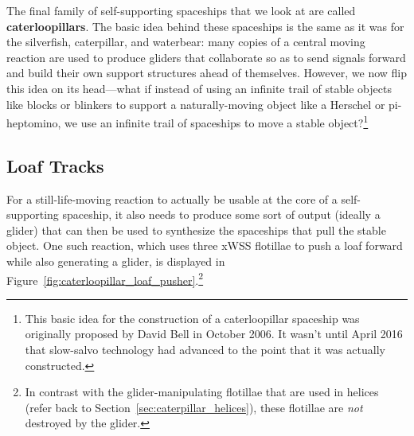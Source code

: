 The final family of self-supporting spaceships that we look at are called \textbf{caterloopillars}. The basic idea behind these spaceships is the same as it was for the silverfish, caterpillar, and waterbear: many copies of a central moving reaction are used to produce gliders that collaborate so as to send signals forward and build their own support structures ahead of themselves. However, we now flip this idea on its head---what if instead of using an infinite trail of stable objects like blocks or blinkers to support a naturally-moving object like a Herschel or pi-heptomino, we use an infinite trail of spaceships to move a stable object?\footnote{This basic idea for the construction of a caterloopillar spaceship was originally proposed by David Bell in October 2006. It wasn't until April 2016 that slow-salvo technology had advanced to the point that it was actually constructed.}


\subsection{Loaf Tracks}\label{sec:caterloopillar_loaf_track}

For a still-life-moving reaction to actually be usable at the core of a self-supporting spaceship, it also needs to produce some sort of output (ideally a glider) that can then be used to synthesize the spaceships that pull the stable object. One such reaction, which uses three xWSS flotillae to push a loaf forward while also generating a glider, is displayed in Figure~\ref{fig:caterloopillar_loaf_pusher}.\footnote{In contrast with the glider-manipulating flotillae that are used in helices (refer back to Section~\ref{sec:caterpillar_helices}), these flotillae are \emph{not} destroyed by the glider.}

